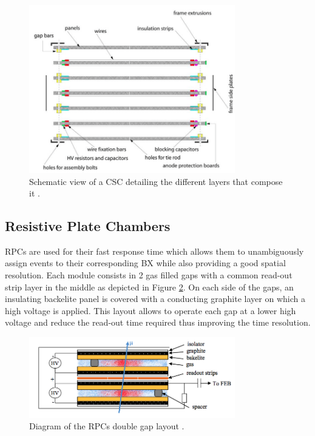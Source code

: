       \begin{figure}[h!]
        \centering
        \includegraphics[width=0.8\textwidth]{img/I-3-cms/csc.png}
        \caption{Schematic view of a CSC detailing the different layers that compose it \cite{1748-0221-3-08-S08004}.}
        \label{fig:I-3-csc}
      \end{figure}

  	\subsection{Resistive Plate Chambers}

      RPCs are used for their fast response time which allows them to unambiguously assign events to their corresponding BX while also providing a good spatial resolution. Each module consists in 2 gas filled gaps with a common read-out strip layer in the middle as depicted in Figure \ref{fig:I-3-rpc}. On each side of the gaps, an insulating backelite panel is covered with a conducting graphite layer on which a high voltage is applied. This layout allows to operate each gap at a lower high voltage and reduce the read-out time required thus improving the time resolution. \\

      \begin{figure}[h!]
        \centering
        \includegraphics[width=0.8\textwidth]{img/I-3-cms/rpc.png}
        \caption{Diagram of the RPCs double gap layout \cite{1748-0221-3-08-S08004}.}
        \label{fig:I-3-rpc}
      \end{figure}

